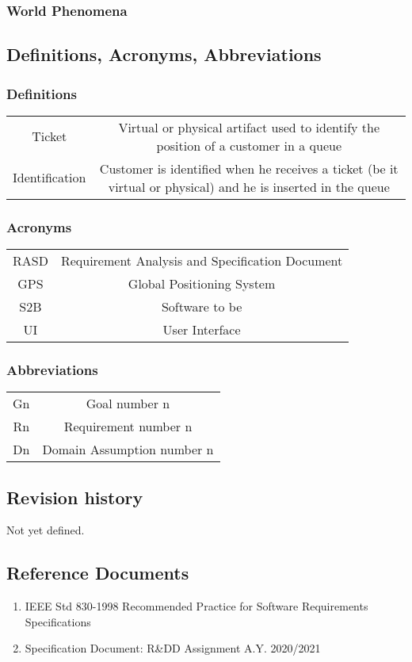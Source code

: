 \subsubsection{World Phenomena}
\subsection{Definitions, Acronyms, Abbreviations}
\subsubsection{Definitions}
\begin{tabular}{ c c }
	Ticket & Virtual or physical artifact used to identify the position of a customer in a queue \\
	Identification & Customer is identified when he receives a ticket (be it virtual or physical) and he is inserted in the queue 
\end{tabular}
\subsubsection{Acronyms}
\begin{tabular}{ c c }
	RASD & Requirement Analysis and Specification Document \\
	GPS & Global Positioning System \\
	S2B & Software to be \\
	UI & User Interface
\end{tabular}
\subsubsection{Abbreviations}
\begin{tabular}{ c c }
	Gn & Goal number n \\
	Rn & Requirement number n \\
	Dn & Domain Assumption number n
\end{tabular}
\subsection{Revision history}
Not yet defined.
\subsection{Reference Documents}
\begin{enumerate}
	\item IEEE Std 830-1998 Recommended Practice for Software Requirements Specifications
	\item Specification Document: R\&DD Assignment A.Y. 2020/2021
\end{enumerate}
